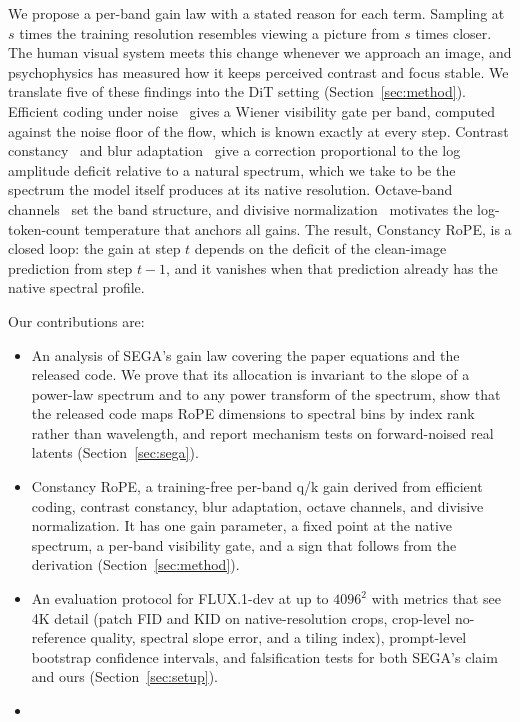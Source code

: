 We propose a per-band gain law with a stated reason for each term. Sampling at $s$ times the training resolution resembles viewing a picture from $s$ times closer. The human visual system meets this change whenever we approach an image, and psychophysics has measured how it keeps perceived contrast and focus stable. We translate five of these findings into the DiT setting (Section~\ref{sec:method}). Efficient coding under noise~\citep{atick1990towards,atick1992retina,vanhateren1992theory} gives a Wiener visibility gate per band, computed against the noise floor of the flow, which is known exactly at every step. Contrast constancy~\citep{georgeson1975contrast} and blur adaptation~\citep{webster2002neural} give a correction proportional to the log amplitude deficit relative to a natural spectrum, which we take to be the spectrum the model itself produces at its native resolution. Octave-band channels~\citep{campbell1968application,field1987relations} set the band structure, and divisive normalization~\citep{heeger1992normalization,carandini2012normalization} motivates the log-token-count temperature that anchors all gains. The result, Constancy RoPE, is a closed loop: the gain at step $t$ depends on the deficit of the clean-image prediction from step $t-1$, and it vanishes when that prediction already has the native spectral profile.

Our contributions are:
\begin{itemize}
  \item An analysis of SEGA's gain law covering the paper equations and the released code. We prove that its allocation is invariant to the slope of a power-law spectrum and to any power transform of the spectrum, show that the released code maps RoPE dimensions to spectral bins by index rank rather than wavelength, and report mechanism tests on forward-noised real latents (Section~\ref{sec:sega}).
  \item Constancy RoPE, a training-free per-band q/k gain derived from efficient coding, contrast constancy, blur adaptation, octave channels, and divisive normalization. It has one gain parameter, a fixed point at the native spectrum, a per-band visibility gate, and a sign that follows from the derivation (Section~\ref{sec:method}).
  \item An evaluation protocol for FLUX.1-dev at up to $4096^2$ with metrics that see 4K detail (patch FID and KID on native-resolution crops, crop-level no-reference quality, spectral slope error, and a tiling index), prompt-level bootstrap confidence intervals, and falsification tests for both SEGA's claim and ours (Section~\ref{sec:setup}).
  \item {}
\end{itemize}
